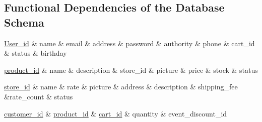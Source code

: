 \documentclass[a4paper, 12pt]{article}
\begin{document}
\subsection{Functional Dependencies of the Database Schema}

\newline
\begin{dependency}
    \begin{deptext}[TxtBook] %
        \underline{User_id} \& name \& email \& address \& password \& authority \& phone \& cart_id \& status \& birthday \\
    \end{deptext}
\end{dependency}

\newline
\begin{dependency}
    \begin{deptext}[TxtBook] %
        \underline{product_id} \& name \& description \& store_id \& picture \& price \& stock \& status \\
    \end{deptext}
\end{dependency}

\newline
\begin{dependency}
    \begin{deptext}[TxtBook] %
        \underline{store_id} \& name \& rate \& picture \& address \& description \& shipping_fee \&rate_count \& status \\
    \end{deptext}
\end{dependency}

\newline
\begin{dependency}
    \begin{deptext}[TxtBook] %
        \underline{customer_id} \& \underline{product_id} \& \underline{cart_id} \& quantity \& event_discount_id \\
    \end{deptext}
\end{dependency}
\end{document}
